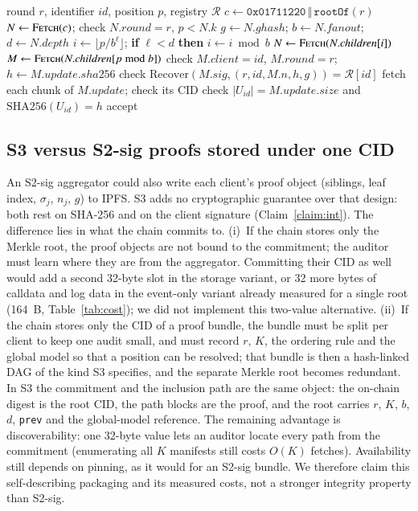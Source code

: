 \documentclass[final,3p,times,twocolumn]{elsarticle}
\begin{document}
\begin{algorithm}[t]
\caption{Per-client verification in S3}\label{alg:verify}
\small
\begin{algorithmic}[1]
\Require round $r$, identifier $\mathit{id}$, position $p$, registry $\mathcal{R}$
\State $c\gets \texttt{0x01711220}\,\Vert\,\texttt{rootOf}(r)$ 
\State $N\gets\Call{Fetch}{c}$; check $N.\mathit{round}=r$, $p<N.k$
\State $g\gets N.\mathit{ghash}$; $b\gets N.\mathit{fanout}$; $d\gets N.\mathit{depth}$
\State $i\gets\lfloor p/b^{\ell}\rfloor$; \textbf{if} $\ell<d$ \textbf{then} $i\gets i \bmod b$
\State $N\gets\Call{Fetch}{N.\mathit{children}[i]}$
\EndFor
\State $M\gets\Call{Fetch}{N.\mathit{children}[p \bmod b]}$
\State check $M.\mathit{client}=\mathit{id}$, $M.\mathit{round}=r$; $h\gets M.\mathit{update}.\mathit{sha256}$
\State check $\mathrm{Recover}(M.\mathit{sig},(r,\mathit{id},M.n,h,g))=\mathcal{R}[\mathit{id}]$
\State fetch each chunk of $M.\mathit{update}$; check its CID
\State check $|U_{\mathit{id}}|=M.\mathit{update}.\mathit{size}$ and $\mathrm{SHA256}(U_{\mathit{id}})=h$
\State \Return accept 
\end{algorithmic}
\end{algorithm}

\subsection{S3 versus S2-sig proofs stored under one CID}\label{sec:residual}
An S2-sig aggregator could also write each client's proof object (siblings, leaf index, $\sigma_j$, $n_j$, $g$) to IPFS. S3 adds no cryptographic guarantee over that design: both rest on SHA-256 and on the client signature (Claim~\ref{claim:int}). The difference lies in what the chain commits to. (i)~If the chain stores only the Merkle root, the proof objects are not bound to the commitment; the auditor must learn where they are from the aggregator. Committing their CID as well would add a second 32-byte slot in the storage variant, or 32 more bytes of calldata and log data in the event-only variant already measured for a single root (164~B, Table~\ref{tab:cost}); we did not implement this two-value alternative. (ii)~If the chain stores only the CID of a proof bundle, the bundle must be split per client to keep one audit small, and must record $r$, $K$, the ordering rule and the global model so that a position can be resolved; that bundle is then a hash-linked DAG of the kind S3 specifies, and the separate Merkle root becomes redundant. In S3 the commitment and the inclusion path are the same object: the on-chain digest is the root CID, the path blocks are the proof, and the root carries $r$, $K$, $b$, $d$, \texttt{prev} and the global-model reference. The remaining advantage is discoverability: one 32-byte value lets an auditor locate every path from the commitment (enumerating all $K$ manifests still costs $O(K)$ fetches). Availability still depends on pinning, as it would for an S2-sig bundle. We therefore claim this self-describing packaging and its measured costs, not a stronger integrity property than S2-sig.
\end{document}
